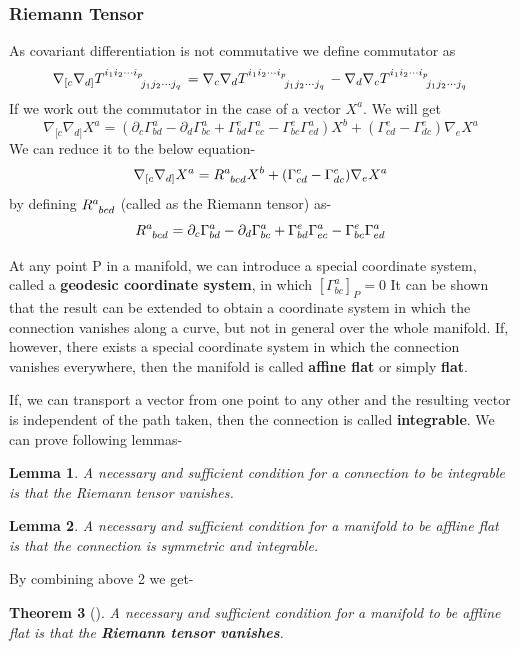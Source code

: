 \documentclass[12pt,a4paper]{article}
\numberwithin{table}{section}
\numberwithin{figure}{section}
\numberwithin{equation}{section}
\newtheorem{theorem}{Theorem}[section]
\newtheorem{lemma}[theorem]{Lemma}
\theoremstyle{remark}
\theoremstyle{definition}
\begin{document}
\subsubsection*{Riemann Tensor}
As covariant differentiation is not commutative we define commutator as
$$\nabla_{[c}\nabla_{d]} \tensor{T}{^{i_1i_2\cdots i_p}_{j_1j_2\cdots j_q}}=\nabla_c\nabla_d \tensor{T}{^{i_1i_2\cdots i_p}_{j_1j_2\cdots j_q}}-\nabla_d\nabla_c \tensor{T}{^{i_1i_2\cdots i_p}_{j_1j_2\cdots j_q}} $$
If we work out the commutator in the case of a vector $X^a$. We will get
$$\nabla_{[c}\nabla_{d]} X^a=(\partial_c\Gamma^a_{bd}-\partial_d\Gamma^a_{bc}+\Gamma^e_{bd}\Gamma^a_{ec}-\Gamma^e_{bc}\Gamma^a_{ed})X^b+(\Gamma^e_{cd}-\Gamma^e_{dc})\nabla_e X^a $$
We can reduce it to the below equation-
$$\nabla_{[c}\nabla_{d]} X^a=\tensor{R}{^{a}_{bcd}}X^b+(\Gamma^e_{cd}-\Gamma^e_{dc})\nabla_e X^a $$
by defining $\tensor{R}{^{a}_{bcd}}$ (called as the Riemann tensor) as-
$$\tensor{R}{^{a}_{bcd}}=\partial_c\Gamma^a_{bd}-\partial_d\Gamma^a_{bc}+\Gamma^e_{bd}\Gamma^a_{ec}-\Gamma^e_{bc}\Gamma^a_{ed} $$


At any point P in a manifold, we can introduce a special coordinate system, called a \textbf{geodesic coordinate system}, in which $[\Gamma^a_{bc}]_P=0$
It can be shown that the result can be extended to obtain a 
coordinate system in which the connection vanishes along a curve, but not in 
general over the whole manifold. If, however, there exists a special coordinate 
system in which the connection vanishes everywhere, then the manifold is 
called \textbf{affine flat} or simply \textbf{flat}.

If, we can transport a vector from one point to any other and the resulting vector is independent of the path taken, then the connection is called \textbf{integrable}. We can prove following lemmas-
\begin{lemma}
A necessary and sufficient condition for a connection to be integrable is that the Riemann tensor vanishes.
\end{lemma}
\begin{lemma}
A necessary and sufficient condition for a manifold to be affline flat is that the connection is symmetric and integrable.
\end{lemma}
By combining above 2 we get-
\begin{theorem}[]
A necessary and sufficient condition for a manifold to be affline flat is that the \textbf{Riemann tensor vanishes}. 
\end{theorem}
\end{document}
